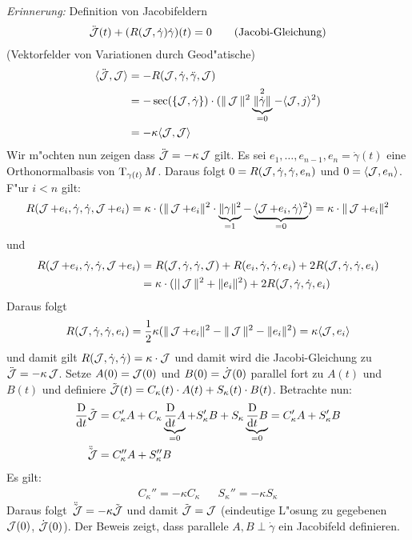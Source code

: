 \begin{Loes}
\emph{Erinnerung:} Definition von Jacobifeldern
\begin{align*}
	\ddot{\operatorname{\mathcal{J}}}(t) + (R(\operatorname{\mathcal{J}}, \dot\gamma) \dot\gamma) (t) = 0 \tag{Jacobi-Gleichung}
\end{align*}
(Vektorfelder von Variationen durch Geod"atische)
\begin{align*}
	\langle \ddot\calJ, \calJ \rangle & = -R(\calJ, \dot\gamma, \ddot\gamma, \calJ) \\
	& = -\sec(\span\{\calJ, \dot\gamma\}) \cdot (\|\calJ\|^2 \underbrace{\|\dot\gamma\|}_{=0}^2 - \langle\calJ, j \rangle^2) \\
	& = - \kappa \langle \calJ, \calJ \rangle
\end{align*}
Wir m"ochten nun zeigen dass $\ddot{\operatorname{\mathcal{J}}} = -\kappa \operatorname{\mathcal{J}}$ gilt. Es sei $e_1, \ldots ,e_{n-1}, e_n = \dot\gamma(t)$ eine Orthonormalbasis von $\operatorname{T}_{\gamma(t)}M$.
Daraus folgt $0 = R(\operatorname{\mathcal{J}}, \dot\gamma, \dot\gamma, e_n)$ und $0 = \langle \operatorname{\mathcal{J}}, e_n \rangle$. F"ur $i < n$ gilt:
\begin{align*}
	R(\operatorname{\mathcal{J}} + e_i, \dot\gamma, \dot\gamma, \operatorname{\mathcal{J}} + e_i) = \kappa \cdot ( \| \operatorname{\mathcal{J}} + e_i \|^2 \cdot \underbrace{\| \gamma \|^2}_{=1} - \underbrace{\langle \operatorname{\mathcal{J}} + e_i, \dot\gamma \rangle^2}_{=0}) = \kappa \cdot \| \operatorname{\mathcal{J}} + e_i \|^2
\end{align*}
und
\begin{align*}
	R(\operatorname{\mathcal{J}} + e_i, \dot\gamma, \dot\gamma, \operatorname{\mathcal{J}} + e_i) &= R(\operatorname{\mathcal{J}}, \dot\gamma, \dot\gamma, \operatorname{\mathcal{J}}) + R(e_i, \dot\gamma, \dot\gamma, e_i) + 2R(\operatorname{\mathcal{J}}, \dot\gamma, \dot\gamma, e_i) \\
	&= \kappa \cdot ( ||\operatorname{\mathcal{J}}\|^2 + \|e_i\|^2) + 2R(\operatorname{\mathcal{J}}, \dot\gamma, \dot\gamma, e_i)
\end{align*}
Daraus folgt
\begin{align*}
	R(\operatorname{\mathcal{J}}, \dot\gamma, \dot\gamma, e_i) = \frac{1}{2}\kappa ( \|\operatorname{\mathcal{J}} + e_i\|^2 - \|\operatorname{\mathcal{J}}\|^2 - \|e_i\|^2 ) = \kappa \langle \operatorname{\mathcal{J}}, e_i \rangle
\end{align*}
und damit gilt $R(\operatorname{\mathcal{J}}, \dot\gamma, \dot\gamma) = \kappa \cdot \operatorname{\mathcal{J}}$ und damit wird die Jacobi-Gleichung zu $\ddot{\operatorname{\mathcal{J}}} = -\kappa \operatorname{\mathcal{J}}$.
Setze $A(0) = \operatorname{\mathcal{J}}(0)$ und $B(0) = \dot{\operatorname{\mathcal{J}}}(0)$ parallel fort zu $A(t)$ und $B(t)$ und definiere $\tilde{\operatorname{\mathcal{J}}}(t) = C_\kappa(t) \cdot A(t) + S_\kappa(t) \cdot B(t)$.
Betrachte nun:
\begin{align*}
	\frac{\operatorname{D}}{\mathrm{d} t} \tilde{\operatorname{\mathcal{J}}} &= C_\kappa' A + C_\kappa \underbrace{\frac{\operatorname{D}}{\mathrm{d} t} A}_{=0} + S_\kappa' B + S_\kappa \underbrace{\frac{\operatorname{D}}{\mathrm{d} t} B}_{=0} = C_\kappa' A + S_\kappa' B \\
	\ddot{\tilde{\operatorname{\mathcal{J}}}} &= C_\kappa'' A + S_\kappa'' B
\end{align*}
Es gilt:
\begin{align*}
	C_\kappa'' = -\kappa C_\kappa && S_\kappa'' = -\kappa S_\kappa
\end{align*}
Daraus folgt $\ddot{\tilde{\operatorname{\mathcal{J}}}} = -\kappa \tilde{\operatorname{\mathcal{J}}}$ und damit $\tilde{\operatorname{\mathcal{J}}} = \operatorname{\mathcal{J}}$ (eindeutige L"osung zu gegebenen $\operatorname{\mathcal{J}}(0)$, $\dot{\operatorname{\mathcal{J}}}(0)$).
Der Beweis zeigt, dass parallele $A, B \perp \dot\gamma$ ein Jacobifeld definieren.
\end{Loes}


